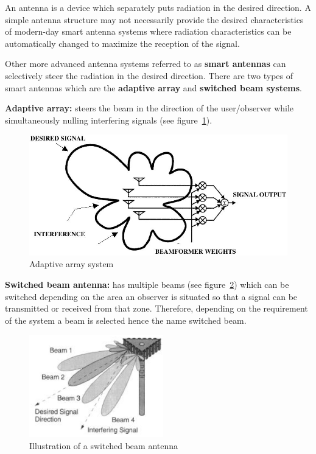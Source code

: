 An antenna is a device which separately puts radiation in the desired direction. A simple antenna structure may not necessarily provide the desired characteristics of modern-day smart antenna systems where radiation characteristics can be automatically changed to maximize the reception of the signal.

Other more advanced antenna systems referred to as \textbf{smart antennas} can selectively steer the radiation in the desired direction. There are two types of smart antennas which are the \textbf{adaptive array} and \textbf{switched beam systems}.

\textbf{Adaptive array:} steers the beam in the direction of the user/observer while simultaneously nulling interfering signals (see figure~\ref{fig:fh06_02}).
\begin{figure}[h]
\centering
\includegraphics[scale=0.3]{./graphics/fh06_02}
\caption{Adaptive array system}
\label{fig:fh06_02}
\end{figure}

\textbf{Switched beam antenna:} has multiple beams (see figure~\ref{fig:switchedbeam}) which can be switched depending on the area an observer is situated so that a signal can be transmitted or received from that zone. Therefore, depending on the requirement of the system a beam is selected hence the name switched beam.
\begin{figure}[h]
\centering
\includegraphics[scale=0.7]{./graphics/switchedbeam}
\caption{Illustration of a switched beam antenna}
\label{fig:switchedbeam}
\end{figure} 


